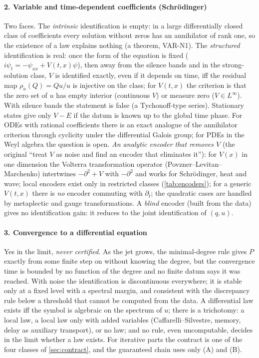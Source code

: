\documentclass[11pt]{article}
\theoremstyle{plain}
\theoremstyle{definition}
\theoremstyle{remark}
\begin{document}
\paragraph{2. Variable and time-dependent coefficients (Schr\"odinger)} Two faces. The \emph{intrinsic} identification is empty: in a large differentially closed class of coefficients every solution without zeros has an annihilator of rank one, so the existence of a law explains nothing (a theorem, VAR-N1).
The \emph{structured} identification is real: once the form of the equation is fixed ($i\psi_t=-\psi_{xx}+V(t,x)\psi$), then away from the silence bands and in the strong-solution class, $V$ is identified exactly, even if it depends on time, iff the residual map $\rho_u(Q)=Qu/u$ is injective on the class; for $V(t,x)$ the criterion is that the zero set of $u$ has empty interior (continuous $V$) or measure zero ($V\in L^\infty$). With silence bands the statement is false (a Tychonoff-type series). Stationary states give only $V-E$ if the datum is known up to the global time phase.
For ODEs with rational coefficients there is an exact analogue of the annihilator criterion through cyclicity under the differential Galois group; for PDEs in the Weyl algebra the question is open.
\emph{An analytic encoder that removes $V$} (the original ``treat $V$ as noise and find an encoder that eliminates it''): for $V(x)$ in one dimension the Volterra transformation operator (Povzner--Levitan--Marchenko) intertwines $-\partial^2+V$ with $-\partial^2$ and works for Schr\"odinger, heat and wave; local encoders exist only in restricted classes (\cref{tab:encoders}); for a generic $V(t,x)$ there is \emph{no} encoder commuting with $\partial_t$; the quadratic cases are handled by metaplectic and gauge transformations. A \emph{blind} encoder (built from the data) gives no identification gain: it reduces to the joint identification of $(q,u)$.

\paragraph{3. Convergence to a differential equation} Yes in the limit, \emph{never certified}. As the jet grows, the minimal-degree rule gives $P$ exactly from some finite step on without knowing the degree, but the convergence time is bounded by no function of the degree and no finite datum says it was reached.
With noise the identification is discontinuous everywhere; it is stable only at a fixed level with a spectral margin, and consistent with the discrepancy rule below a threshold that cannot be computed from the data. A differential law exists iff the symbol is algebraic on the spectrum of $u$; there is a trichotomy: a local law, a local law only with added variables (Caffarelli--Silvestre, memory, delay as auxiliary transport), or no law; and no rule, even uncomputable, decides in the limit whether a law exists.
For iterative parts the contract is one of the four classes of \cref{sec:contract}, and the guaranteed chain uses only (A) and (B).
\end{document}
